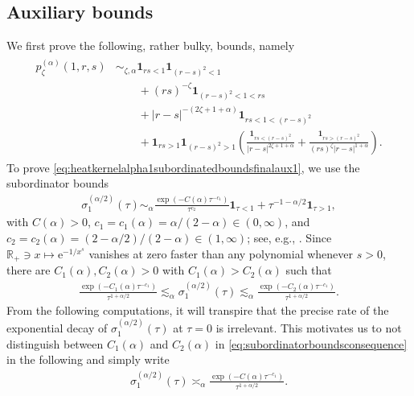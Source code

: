 \documentclass[12pt,reqno,a4paper]{amsart}
\theoremstyle{definition}
\theoremstyle{remark}
\numberwithin{equation}{section}
\newcommand{\1}{\mathbbm{1}}
\newcommand{\R}{\mathbb{R}}
\newcommand{\me}[1]{\mathrm{e}^{#1}}
\newcommand{\one}{\mathbf{1}}
\begin{document}
\subsection{Auxiliary bounds}\label{A.1}

We first prove the following, rather bulky, bounds, namely
\begin{align}
  \begin{split}
    \label{eq:heatkernelalpha1subordinatedboundsfinalaux1}
    p_\zeta^{(\alpha)}(1,r,s)
    & \sim_{\zeta,\alpha} \one_{rs<1}\one_{(r-s)^2<1} \\
    & \qquad + (rs)^{-\zeta}\one_{(r-s)^2<1<rs} \\
    & \qquad + |r-s|^{-(2\zeta+1+\alpha)}\one_{rs<1<(r-s)^2} \\
    & \qquad + \one_{rs>1}\one_{(r-s)^2>1} \left(\! \frac{\one_{rs<(r-s)^2}}{|r-s|^{2\zeta+1+\alpha}} + \frac{\one_{rs>(r-s)^2}}{(rs)^{\zeta} |r-s|^{1+\alpha}} \!\right).
    \end{split}
\end{align}
To prove \eqref{eq:heatkernelalpha1subordinatedboundsfinalaux1}, we use the subordinator bounds
\begin{align}
  \sigma_{1}^{(\alpha/2)}(\tau)
  \sim_\alpha \frac{\exp\left(-C(\alpha)\tau^{-c_1}\right)}{\tau^{c_2}}\one_{\tau<1} + \tau^{-1-\alpha/2} \one_{\tau>1},
\end{align}
with $C(\alpha)>0$, $c_1=c_1(\alpha)=\alpha/(2-\alpha)\in(0,\infty)$, and $c_2=c_2(\alpha)=(2-\alpha/2)/(2-\alpha)\in(1,\infty)$; see, e.g., \cite[Proposition~B.1]{BogdanMerz2024}.
Since $\R_+\ni x\mapsto\me{-1/x^s}$ vanishes at zero faster than any polynomial whenever $s>0$, there are $C_1(\alpha),C_2(\alpha)>0$ with $C_1(\alpha)>C_2(\alpha)$ such that
\begin{align}
  \label{eq:subordinatorboundsconsequence}
  \frac{\exp\left(-C_1(\alpha)\tau^{-c_1}\right)}{\tau^{1+\alpha/2}}
  \lesssim_\alpha \sigma_{1}^{(\alpha/2)}(\tau)
  \lesssim_\alpha \frac{\exp\left(-C_2(\alpha)\tau^{-c_1}\right)}{\tau^{1+\alpha/2}}.
\end{align}
From the following computations, it will transpire that the precise rate of the exponential decay of $\sigma_1^{(\alpha/2)}(\tau)$ at $\tau=0$ is irrelevant. This motivates us to not distinguish between $C_1(\alpha)$ and $C_2(\alpha)$ in \eqref{eq:subordinatorboundsconsequence} in the following and simply write
\begin{align}
  \label{eq:subordinatorboundsconsequence2}
  \sigma_{1}^{(\alpha/2)}(\tau)
  \asymp_\alpha \frac{\exp\left(-C(\alpha)\tau^{-c_1}\right)}{\tau^{1+\alpha/2}}.
\end{align}
\end{document}
